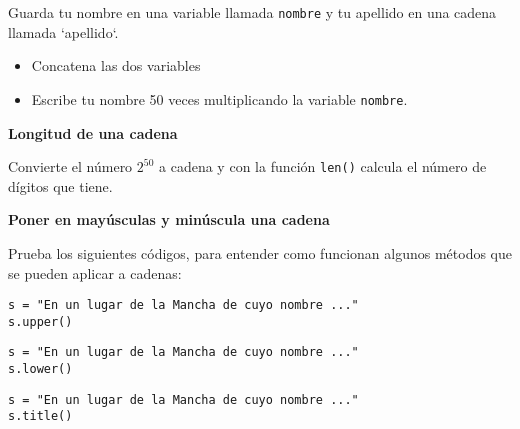 \documentclass[a4paper, 11pt]{scrartcl}
\newenvironment{code}{\begin{tcolorbox}[colback=red!2!white]}{\end{tcolorbox}}
\begin{document}
Guarda tu nombre en una variable llamada \verb|nombre| y tu apellido en una cadena llamada `apellido`. 

\begin{itemize}

\item Concatena las dos variables

\item  Escribe tu nombre 50 veces multiplicando la variable \verb|nombre|.

\end{itemize}






\noindent\textbf{\sffamily Longitud de una cadena}

Convierte el número $2^{50}$ a cadena y con la función \verb|len()| calcula el número de dígitos que tiene.






\noindent\textbf{\sffamily \dag{} Poner en mayúsculas y minúscula una cadena}

Prueba los siguientes códigos, para entender como funcionan algunos métodos que se pueden aplicar a cadenas:

\smallskip

\begin{code}

\begin{verbatim}
s = "En un lugar de la Mancha de cuyo nombre ..."
s.upper()
\end{verbatim}

\end{code}


\smallskip

\begin{code}

\begin{verbatim}
s = "En un lugar de la Mancha de cuyo nombre ..."
s.lower()
\end{verbatim}

\end{code}

\smallskip

\begin{code}

\begin{verbatim}
s = "En un lugar de la Mancha de cuyo nombre ..."
s.title()
\end{verbatim}

\end{code}
\end{document}
